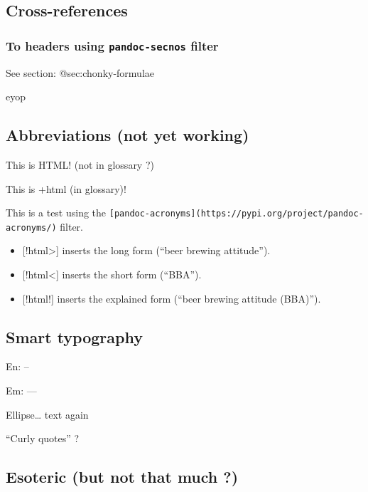 \documentclass[
]{tufte-pandoc}
\providecommand{\tightlist}{%
  \setlength{\itemsep}{0pt}\setlength{\parskip}{0pt}}
\begin{document}
\hypertarget{cross-references}{%
\subsection{Cross-references}\label{cross-references}}

\hypertarget{to-headers-using-pandoc-secnos-filter}{%
\subsubsection{\texorpdfstring{To headers using \texttt{pandoc-secnos}
filter}{To headers using pandoc-secnos filter}}\label{to-headers-using-pandoc-secnos-filter}}

See section: @sec:chonky-formulae

eyop

\hypertarget{abbreviations-not-yet-working}{%
\subsection{Abbreviations (not yet
working)}\label{abbreviations-not-yet-working}}

This is HTML! (not in glossary ?)

This is +html (in glossary)!

This is a test using the
\texttt{{[}pandoc-acronyms{]}(https://pypi.org/project/pandoc-acronyms/)}
filter.

\begin{itemize}
\tightlist
\item
  {[}!html\textgreater{]} inserts the long form (``beer brewing
  attitude'').
\item
  {[}!html\textless{]} inserts the short form (``BBA'').
\item
  {[}!html!{]} inserts the explained form (``beer brewing attitude
  (BBA)'').
\end{itemize}

\hypertarget{smart-typography}{%
\subsection{Smart typography}\label{smart-typography}}

En: --

Em: ---

Ellipse\ldots{} text again

``Curly quotes'' ?

\hypertarget{esoteric-but-not-that-much}{%
\subsection{Esoteric (but not that much
?)}\label{esoteric-but-not-that-much}}
\end{document}
